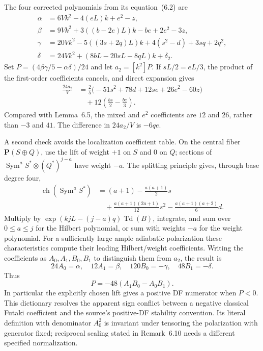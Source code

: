 The four corrected polynomials from its equation~(6.2) are
\[
 \begin{aligned}
 \alpha&=6Vk^2-4(eL)k+e^2-z,\\
 \beta&=9Vk^2+3((b-2e)L)k-be+2e^2-3z,\\
 \gamma&=20Vk^2-5((3s+2q)L)k
                 +4(s^2-d)+3sq+2q^2,\\
 \delta&=24Vk^2+(8bL-20sL-8qL)k+\delta_2.
 \end{aligned}
\]
Set $P=(4\beta\gamma/5-\alpha\delta)/24$ and let
$a_2=[k^2]P$. If $sL/2=eL/3$, the product of the first-order
coefficients cancels, and direct expansion gives
\[
 \begin{aligned}
 \frac{24a_2}{V}
 &=\frac25\bigl(-51s^2+78d+12se+26e^2-60z\bigr)\\
 &\quad+12\left(\frac{bs}{2}-\frac{be}{3}\right).
 \end{aligned}
\]
Compared with Lemma~6.5, the mixed and $e^2$ coefficients
are $12$ and $26$, rather than $-3$ and $41$. The difference
in $24a_2/V$ is $-6qe$.

A second check avoids the localization coefficient table.
On the central fiber $\mathbf P(S\oplus Q)$, use the lift
of weight $+1$ on $S$ and $0$ on $Q$; sections of
$\operatorname{Sym}^aS^*\otimes(Q^*)^{j-a}$ have weight $-a$.
The splitting principle gives, through base degree four,
\[
 \begin{aligned}
 \operatorname{ch}(\operatorname{Sym}^aS^*)
 &=(a+1)-\frac{a(a+1)}2s\\
 &\quad+\frac{a(a+1)(2a+1)}{12}s^2
       -\frac{a(a+1)(a+2)}6d.
 \end{aligned}
\]
Multiply by $\exp(kjL-(j-a)q)\operatorname{Td}(B)$,
integrate, and sum over $0\leq a\leq j$ for the Hilbert
polynomial, or sum with weights $-a$ for the weight polynomial.
For a sufficiently large ample adiabatic polarization these
characteristics compute their leading Hilbert/weight coefficients.
Writing the coefficients as $A_0,A_1,B_0,B_1$ to distinguish
them from $a_2$, the result is
\[
 24A_0=\alpha,\quad 12A_1=\beta,\quad
 120B_0=-\gamma,\quad48B_1=-\delta.
\]
Thus
\[
 P=-48(A_1B_0-A_0B_1).
\]
In particular the explicitly chosen lift gives a positive DF
numerator when $P<0$. This dictionary resolves the apparent
sign conflict between a negative classical Futaki coefficient
and the source's positive-DF stability convention. Its literal
definition with denominator $A_0^2$ is invariant under tensoring
the polarization with generator fixed; reciprocal scaling stated
in Remark~6.10 needs a different specified normalization.

